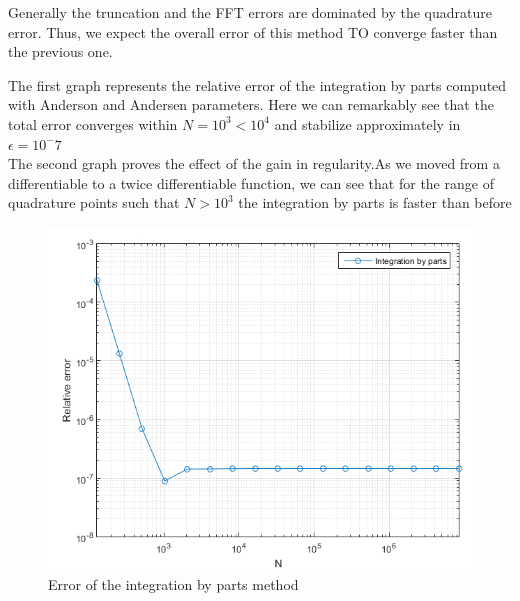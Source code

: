 \documentclass[12pt]{report}
\begin{document}
Generally the truncation and the FFT errors are dominated by the quadrature error. Thus, we expect the overall error of this method TO converge faster than the previous one.

The first graph represents the relative error of the integration by parts computed with Anderson and Andersen parameters. Here we can remarkably see that the total error converges within $N = 10^3 < 10^4 $ and stabilize  approximately in $\epsilon=10^-7$\\

The second graph proves the effect of the gain in regularity.As we moved from a differentiable to a twice differentiable function, we can see that for the range of quadrature points such that $N > 10^3$ the integration by parts is faster than before

\begin{figure}[H]

\centering
\includegraphics[scale=0.7]{Integrationbp.png} 
\caption{Error of the integration by parts method}
\end{figure}
 
\end{document}
